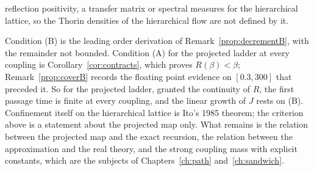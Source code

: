\begin{remark}
reflection positivity, a transfer matrix or spectral measures for the hierarchical lattice, so the Thorin densities of the hierarchical flow are not defined by it.
\end{remark}

Condition (B) is the leading order derivation of Remark~\ref{prop:decrementB}, with the remainder not bounded. Condition (A) for the projected ladder at every coupling is Corollary~\ref{cor:contracts}, which proves $R(\beta)<\beta$; Remark~\ref{prop:coverB} records the floating point evidence on $[0.3,300]$ that preceded it. So for the projected ladder, granted the continuity of $R$, the first passage time is finite at every coupling, and the linear growth of $J$ rests on (B). Confinement itself on the hierarchical lattice is Ito's 1985 theorem; the criterion above is a statement about the projected map only. What remains is the relation between the projected map and the exact recursion, the relation between the approximation and the real theory, and the strong coupling mass with explicit constants, which are the subjects of Chapters~\ref{ch:path} and~\ref{ch:sandwich}.

